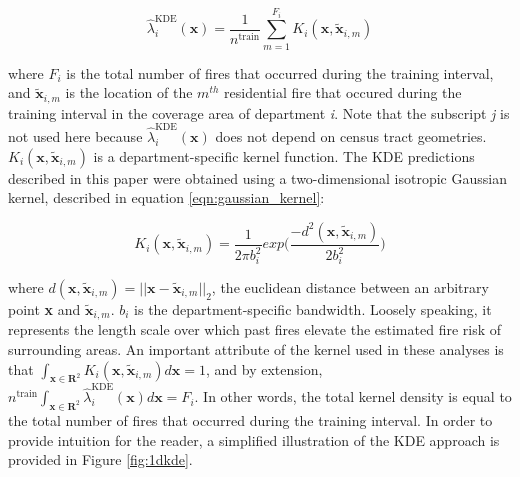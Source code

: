 \documentclass{svjour3}
\begin{document}
\begin{equation}
  \label{eqn:kde}
  \hat\lambda_{i}^\text{KDE}(\textbf{x}) = \frac{1}{n^{\text{train}}}\sum_{m=1}^{F_i}K_i(\textbf{x},\tilde{\textbf{x}}_{i,m})
\end{equation}

\noindent where $F_i$ is the total number of fires that occurred during the training interval, and $\tilde{\textbf{x}}_{i,m}$ is the location of the $m^{th}$ residential fire that occured during the training interval in the coverage area of department \textit{i}. Note that the subscript \textit{j} is not used here because $\hat\lambda_{i}^\text{KDE}(\textbf{x})$ does not depend on census tract geometries. $K_i(\textbf{x},\tilde{\textbf{x}}_{i,m})$ is a department-specific kernel function. The KDE predictions described in this paper were obtained using a two-dimensional isotropic Gaussian kernel, described in equation \ref{eqn:gaussian_kernel}:

\begin{equation}
  \label{eqn:gaussian_kernel}
  K_i(\textbf{x},\tilde{\textbf{x}}_{i,m}) = \frac{1}{2\pi b_{i}^2}exp\bigg(\frac{-d^2(\textbf{x},\tilde{\textbf{x}}_{i,m})}{2b_{i}^2}\bigg)
\end{equation}

\noindent where $d(\textbf{x},\tilde{\textbf{x}}_{i,m})= ||\textbf{x} - \tilde{\textbf{x}}_{i,m}||_2$, the euclidean distance between an arbitrary point \textbf{x} and $\tilde{\textbf{x}}_{i,m}$. $b_i$ is the department-specific bandwidth. Loosely speaking, it represents the length scale over which past fires elevate the estimated fire risk of surrounding areas. An important attribute of the kernel used in these analyses is that $\int_{\textbf{x} \in \textbf{R}^2}K_i(\textbf{x},\tilde{\textbf{x}}_{i,m})d\textbf{x} = 1$, and by extension, $n^{\text{train}}\int_{\textbf{x} \in \textbf{R}^2}\hat\lambda_{i}^\text{KDE}(\textbf{x}) d\textbf{x} = F_i$. In other words, the total kernel density is equal to the total number of fires that occurred during the training interval. In order to provide intuition for the reader, a simplified illustration of the KDE approach is provided in Figure \ref{fig:1dkde}.
\end{document}
